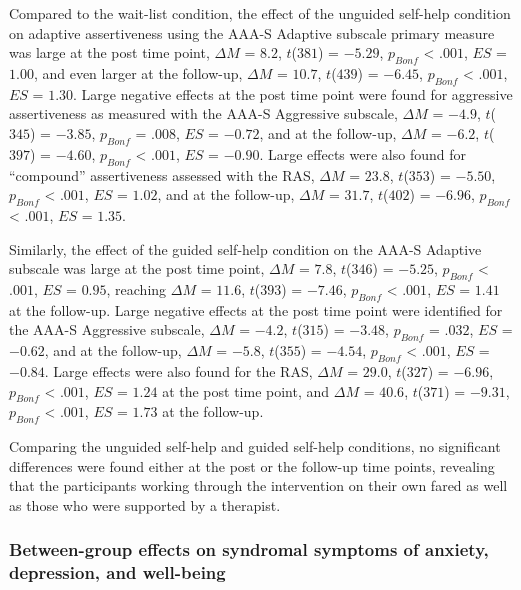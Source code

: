 \documentclass[3p]{elsarticle} %
\begin{document}
Compared to the wait-list condition, the effect of the unguided
self-help condition on adaptive assertiveness using the AAA-S Adaptive
subscale primary measure was large at the post time point, \(\Delta M\)
= \(8.2\), \(t\)(\(381\)) = \(-5.29\), \(p_{ Bonf }\) \textless{}
\(.001\), \(ES\) = \(1.00\), and even larger at the follow-up,
\(\Delta M\) = \(10.7\), \(t\)(\(439\)) = \(-6.45\), \(p_{ Bonf }\)
\textless{} \(.001\), \(ES\) = \(1.30\). Large negative effects at the
post time point were found for aggressive assertiveness as measured with
the AAA-S Aggressive subscale, \(\Delta M\) = \(-4.9\), \(t\)(\(345\)) =
\(-3.85\), \(p_{ Bonf }\) = \(.008\), \(ES\) = \(-0.72\), and at the
follow-up, \(\Delta M\) = \(-6.2\), \(t\)(\(397\)) = \(-4.60\),
\(p_{ Bonf }\) \textless{} \(.001\), \(ES\) = \(-0.90\). Large effects
were also found for ``compound'' assertiveness assessed with the RAS,
\(\Delta M\) = \(23.8\), \(t\)(\(353\)) = \(-5.50\), \(p_{ Bonf }\)
\textless{} \(.001\), \(ES\) = \(1.02\), and at the follow-up,
\(\Delta M\) = \(31.7\), \(t\)(\(402\)) = \(-6.96\), \(p_{ Bonf }\)
\textless{} \(.001\), \(ES\) = \(1.35\).

Similarly, the effect of the guided self-help condition on the AAA-S
Adaptive subscale was large at the post time point, \(\Delta M\) =
\(7.8\), \(t\)(\(346\)) = \(-5.25\), \(p_{ Bonf }\) \textless{}
\(.001\), \(ES\) = \(0.95\), reaching \(\Delta M\) = \(11.6\),
\(t\)(\(393\)) = \(-7.46\), \(p_{ Bonf }\) \textless{} \(.001\), \(ES\)
= \(1.41\) at the follow-up. Large negative effects at the post time
point were identified for the AAA-S Aggressive subscale, \(\Delta M\) =
\(-4.2\), \(t\)(\(315\)) = \(-3.48\), \(p_{ Bonf }\) = \(.032\), \(ES\)
= \(-0.62\), and at the follow-up, \(\Delta M\) = \(-5.8\),
\(t\)(\(355\)) = \(-4.54\), \(p_{ Bonf }\) \textless{} \(.001\), \(ES\)
= \(-0.84\). Large effects were also found for the RAS, \(\Delta M\) =
\(29.0\), \(t\)(\(327\)) = \(-6.96\), \(p_{ Bonf }\) \textless{}
\(.001\), \(ES\) = \(1.24\) at the post time point, and \(\Delta M\) =
\(40.6\), \(t\)(\(371\)) = \(-9.31\), \(p_{ Bonf }\) \textless{}
\(.001\), \(ES\) = \(1.73\) at the follow-up.

Comparing the unguided self-help and guided self-help conditions, no
significant differences were found either at the post or the follow-up
time points, revealing that the participants working through the
intervention on their own fared as well as those who were supported by a
therapist.

\hypertarget{between-group-effects-on-syndromal-symptoms-of-anxiety-depression-and-well-being}{%
\subsubsection{Between-group effects on syndromal symptoms of anxiety,
depression, and
well-being}\label{between-group-effects-on-syndromal-symptoms-of-anxiety-depression-and-well-being}}
\end{document}
